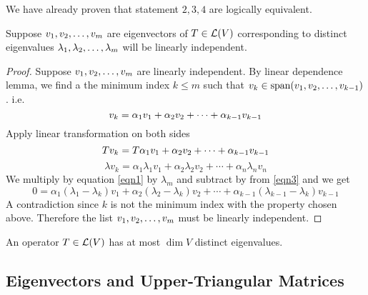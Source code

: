 We have already proven that statement $2,3,4$ are logically equivalent. 
\begin{theorem}
    Suppose ${v}_1,{v}_2, \ldots, {v}_{m}$ are eigenvectors of $T \in \mathcal L(V)$ corresponding to distinct eigenvalues ${\lambda}_1,{\lambda}_2, \ldots, {\lambda}_{m}$ will be linearly independent.
\end{theorem}
\begin{proof}
Suppose ${v}_1,{v}_2, \ldots, {v}_{m}$ are linearly independent. By linear dependence lemma, we find a the minimum index $k \leq m$ such that $v_k \in \text{span} ({v}_1,{v}_2, \ldots, {v}_{k-1})$. i.e.
\begin{equation} \label{eqn1}
     v_k = {\alpha}_1{v}_1 + {\alpha}_2{v}_2 + \cdots + {\alpha}_{k-1}{v}_{k-1} 
\end{equation}
Apply linear transformation on both sides 
\begin{equation} \label{eqn2}
    Tv_k = T{\alpha}_1{v}_1 + {\alpha}_2{v}_2 + \cdots + {\alpha}_{k-1}{v}_{k-1} 
\end{equation}
\begin{equation} \label{eqn3}
    \lambda v_k = \alpha_1 \lambda_1 v_1 + \alpha_2 \lambda_2 v_2 + \cdots + \alpha_n \lambda_n v_n 
\end{equation} 
We multiply by equation \ref{eqn1} by $\lambda_m$ and subtract by from \ref{eqn3} and we get \[ 0 = \alpha_1 (\lambda_1 - \lambda_k)v_1 + \alpha_2(\lambda_2 - \lambda_k)v_2 + \cdots + \alpha_{k-1} (\lambda_{k-1} - \lambda_k)v_{k-1}\]
A contradiction since $k$ is not the minimum index with the property chosen above. Therefore the list ${v}_1,{v}_2, \ldots, {v}_{m}$ must be linearly independent.
\end{proof}
\begin{corollary}
An operator $T \in \mathcal L(V)$ has at most $\boxed{\dim V}$ distinct eigenvalues.
\end{corollary}
\subsection{Eigenvectors and Upper-Triangular
Matrices}
